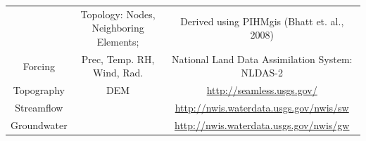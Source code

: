 \documentclass[]{scrbook}
\begin{document}
\begin{longtable}[]{@{}ccc@{}}
\begin{minipage}[t]{0.11\columnwidth}
\end{minipage} & \begin{minipage}[t]{0.19\columnwidth}\centering\strut
Topology: Nodes, Neighboring Elements;\strut
\end{minipage} & \begin{minipage}[t]{0.42\columnwidth}\centering\strut
Derived using PIHMgis (Bhatt et. al., 2008)\strut
\end{minipage}\tabularnewline
\begin{minipage}[t]{0.11\columnwidth}\centering\strut
Forcing\strut
\end{minipage} & \begin{minipage}[t]{0.19\columnwidth}\centering\strut
Prec, Temp. RH, Wind, Rad.\strut
\end{minipage} & \begin{minipage}[t]{0.42\columnwidth}\centering\strut
National Land Data Assimilation System: NLDAS-2\strut
\end{minipage}\tabularnewline
\begin{minipage}[t]{0.11\columnwidth}\centering\strut
Topography\strut
\end{minipage} & \begin{minipage}[t]{0.19\columnwidth}\centering\strut
DEM\strut
\end{minipage} & \begin{minipage}[t]{0.42\columnwidth}\centering\strut
\url{http://seamless.usgs.gov/}\strut
\end{minipage}\tabularnewline
\begin{minipage}[t]{0.11\columnwidth}\centering\strut
Streamflow\strut
\end{minipage} & \begin{minipage}[t]{0.19\columnwidth}\centering\strut
\strut
\end{minipage} & \begin{minipage}[t]{0.42\columnwidth}\centering\strut
\url{http://nwis.waterdata.usgs.gov/nwis/sw}\strut
\end{minipage}\tabularnewline
\begin{minipage}[t]{0.11\columnwidth}\centering\strut
Groundwater\strut
\end{minipage} & \begin{minipage}[t]{0.19\columnwidth}\centering\strut
\strut
\end{minipage} & \begin{minipage}[t]{0.42\columnwidth}\centering\strut
\url{http://nwis.waterdata.usgs.gov/nwis/gw}\strut
\end{minipage}\tabularnewline
\bottomrule
\end{longtable}
\end{document}
